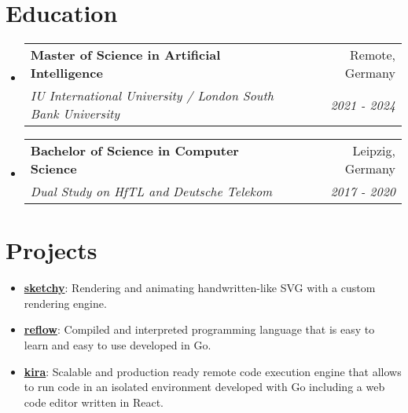\documentclass[letterpaper,11pt]{article}
\makeatletter
\newcommand{\resumeItem}[2]{
  \item\small{
    \textbf{#1}{: #2}
  }
}
\newcommand{\resumeSubheading}[4]{
  \vspace{-1pt}\item
    \begin{tabular*}{0.97\textwidth}[t]{l@{\extracolsep{\fill}}r}
      \textbf{#1} & #2 \\
      \textit{\small#3} & \textit{\small #4} \\
    \end{tabular*}
}
\newcommand{\resumeSubItem}[2]{\resumeItem{#1}{#2}}
\newcommand{\resumeSubHeadingListStart}{\begin{itemize}[leftmargin=*]}
\newcommand{\resumeSubHeadingListEnd}{\end{itemize}}
\makeatother
\begin{document}
\section{Education}
  \resumeSubHeadingListStart
    \resumeSubheading
      {Master of Science in Artificial Intelligence}{Remote, Germany}
      {IU International University / London South Bank University}{2021 - 2024}
      \vspace{-10pt}
    \resumeSubheading
      {Bachelor of Science in Computer Science}{Leipzig, Germany}
      {Dual Study on HfTL and Deutsche Telekom}{2017 - 2020}
  \resumeSubHeadingListEnd


\section{Projects}
  \resumeSubHeadingListStart
    \resumeSubItem{\href{https://sketchy-virid.vercel.app/}{sketchy}}
      {Rendering and animating handwritten-like SVG with a custom rendering engine.}
      \vspace{-5pt}
    \resumeSubItem{\href{https://github.com/FlorianWoelki/reflow}{reflow}}
      {Compiled and interpreted programming language that is easy to learn and easy to use developed in Go.}
      \vspace{-5pt}
    \resumeSubItem{\href{https://github.com/FlorianWoelki/kira}{kira}}
      {Scalable and production ready remote code execution engine that allows to run code in an isolated environment developed with Go including a web code editor written in React.}
      \vspace{-5pt}
  \resumeSubHeadingListEnd


\end{document}
